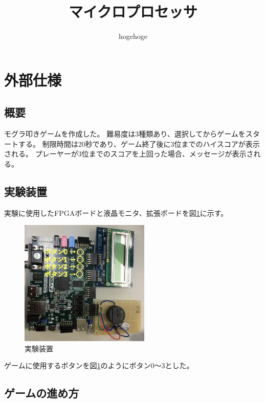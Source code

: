 \documentclass[11pt,a4j]{jsarticle}
\makeatletter
\newcommand{\figcaption}[1]{\def\@captype{figure}\caption{#1}}
\makeatother
\begin{document}
\title{マイクロプロセッサ}
\author{hogehoge}
\maketitle





\section{外部仕様}
\label{sec:外部仕様}

\subsection{概要}
\label{sub:概要}

モグラ叩きゲームを作成した。
難易度は3種類あり、選択してからゲームをスタートする。
制限時間は20秒であり、ゲーム終了後に3位までのハイスコアが表示される。
プレーヤーが3位までのスコアを上回った場合、メッセージが表示される。

\subsection{実験装置}
\label{sub:実験装置}
実験に使用したFPGAボードと液晶モニタ、拡張ボードを図\ref{fig:machine}に示す。

\begin{figure}[H]
  \centering
  \includegraphics[height=60mm,bb=0 0 795 769]{img/machine.png}
  \figcaption{実験装置}
  \label{fig:machine}
\end{figure}

ゲームに使用するボタンを図\ref{fig:machine}のようにボタン0～3とした。

\subsection{ゲームの進め方}
\label{sub:ゲームの進め方}
\end{document}
